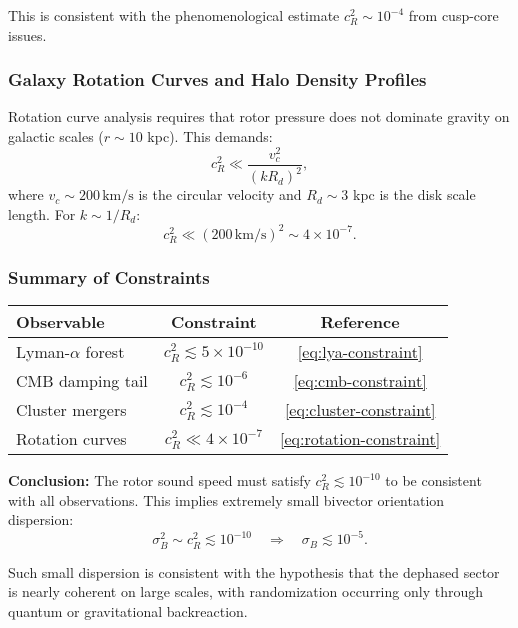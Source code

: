 \documentclass[11pt,a4paper]{article}
\numberwithin{equation}{section}
\theoremstyle{plain}
\theoremstyle{definition}
\theoremstyle{remark}
\begin{document}
This is consistent with the phenomenological estimate $c_R^2 \sim 10^{-4}$ from cusp-core issues.

\subsubsection{Galaxy Rotation Curves and Halo Density Profiles}

Rotation curve analysis requires that rotor pressure does not dominate gravity on galactic scales ($r \sim 10$ kpc). This demands:
\begin{equation}
c_R^2 \ll \frac{v_c^2}{(kR_d)^2},
\end{equation}
where $v_c \sim 200\,\text{km/s}$ is the circular velocity and $R_d \sim 3$ kpc is the disk scale length. For $k \sim 1/R_d$:
\begin{equation}
c_R^2 \ll (200\,\text{km/s})^2 \sim 4 \times 10^{-7}.
\label{eq:rotation-constraint}
\end{equation}

\subsubsection{Summary of Constraints}

\begin{center}
\begin{tabular}{lcc}
\toprule
Observable & Constraint & Reference \\
\midrule
Lyman-$\alpha$ forest & $c_R^2 \lesssim 5 \times 10^{-10}$ & \eqref{eq:lya-constraint} \\
CMB damping tail & $c_R^2 \lesssim 10^{-6}$ & \eqref{eq:cmb-constraint} \\
Cluster mergers & $c_R^2 \lesssim 10^{-4}$ & \eqref{eq:cluster-constraint} \\
Rotation curves & $c_R^2 \ll 4 \times 10^{-7}$ & \eqref{eq:rotation-constraint} \\
\bottomrule
\end{tabular}
\end{center}

\textbf{Conclusion:} The rotor sound speed must satisfy $c_R^2 \lesssim 10^{-10}$ to be consistent with all observations. This implies extremely small bivector orientation dispersion:
\begin{equation}
\sigma_B^2 \sim c_R^2 \lesssim 10^{-10} \quad\Rightarrow\quad \sigma_B \lesssim 10^{-5}.
\end{equation}

Such small dispersion is consistent with the hypothesis that the dephased sector is nearly coherent on large scales, with randomization occurring only through quantum or gravitational backreaction.
\end{document}
